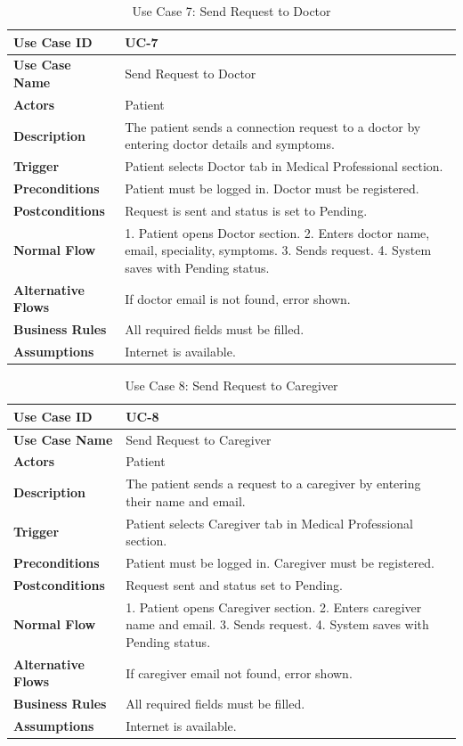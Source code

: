 \begin{table}[H]
\centering
\caption{Use Case 7: Send Request to Doctor}
\begin{tabularx}{\textwidth}{|l|X|}
\hline
\textbf{Use Case ID} & UC-7 \\ \hline
\textbf{Use Case Name} & Send Request to Doctor \\ \hline
\textbf{Actors} & Patient \\ \hline
\textbf{Description} & The patient sends a connection request to a doctor by entering doctor details and symptoms. \\ \hline
\textbf{Trigger} & Patient selects Doctor tab in Medical Professional section. \\ \hline
\textbf{Preconditions} & Patient must be logged in. Doctor must be registered. \\ \hline
\textbf{Postconditions} & Request is sent and status is set to Pending. \\ \hline
\textbf{Normal Flow} & 1. Patient opens Doctor section. 2. Enters doctor name, email, speciality, symptoms. 3. Sends request. 4. System saves with Pending status. \\ \hline
\textbf{Alternative Flows} & If doctor email is not found, error shown. \\ \hline
\textbf{Business Rules} & All required fields must be filled. \\ \hline
\textbf{Assumptions} & Internet is available. \\ \hline
\end{tabularx}
\end{table}

\begin{table}[H]
\centering
\caption{Use Case 8: Send Request to Caregiver}
\begin{tabularx}{\textwidth}{|l|X|}
\hline
\textbf{Use Case ID} & UC-8 \\ \hline
\textbf{Use Case Name} & Send Request to Caregiver \\ \hline
\textbf{Actors} & Patient \\ \hline
\textbf{Description} & The patient sends a request to a caregiver by entering their name and email. \\ \hline
\textbf{Trigger} & Patient selects Caregiver tab in Medical Professional section. \\ \hline
\textbf{Preconditions} & Patient must be logged in. Caregiver must be registered. \\ \hline
\textbf{Postconditions} & Request sent and status set to Pending. \\ \hline
\textbf{Normal Flow} & 1. Patient opens Caregiver section. 2. Enters caregiver name and email. 3. Sends request. 4. System saves with Pending status. \\ \hline
\textbf{Alternative Flows} & If caregiver email not found, error shown. \\ \hline
\textbf{Business Rules} & All required fields must be filled. \\ \hline
\textbf{Assumptions} & Internet is available. \\ \hline
\end{tabularx}
\end{table}

